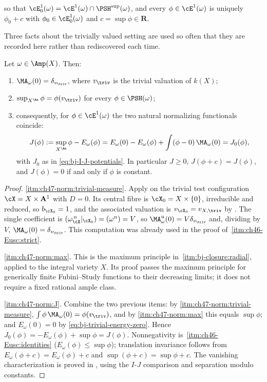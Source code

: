 so that $\cE^1_0(\omega)=\cE^1(\omega)\cap\PSH^{\sup}(\omega)$, and every
$\phi\in\cE^1(\omega)$ is uniquely $\phi_0+c$ with
$\phi_0\in\cE^1_0(\omega)$ and $c=\sup\phi\in\mathbf R$.

Three facts about the trivially valued setting are used so often that they
are recorded here rather than rediscovered each time.

\begin{lemma}
\label{lem:ch47-three-normalizations}
Let $\omega\in\Amp(X)$.  Then:
\begin{enumerate}
\item\label{itm:ch47-norm:trivial-measure}
      $\MA_\omega(0)=\delta_{v_{\triv}}$, where $v_{\triv}$ is the
      trivial valuation of $k(X)$;
\item\label{itm:ch47-norm:max}
      $\sup_{X^{\An}}\phi=\phi(v_{\triv})$ for every
      $\phi\in\PSH(\omega)$;
\item\label{itm:ch47-norm:J}
      consequently, for $\phi\in\cE^1(\omega)$ the two natural
      normalizing functionals coincide:
      \[
       J(\phi):=\sup_{X^{\An}}\phi-E_\omega(\phi)
       =E_\omega(0)-E_\omega(\phi)+\int(\phi-0)\,\MA_\omega(0)
       =J_0(\phi),
      \]
      with $J_0$ as in \eqref{eq:bj-I-J-potentials}.  In particular
      $J\ge0$, $J(\phi+c)=J(\phi)$, and $J(\phi)=0$ if and only if
      $\phi$ is constant.
\end{enumerate}
\end{lemma}

\begin{proof}
\cref{itm:ch47-norm:trivial-measure}.  Apply
 on the trivial test configuration
$\cX=X\times\mathbf A^1$ with $D=0$.  Its central fibre is
$\cX_0=X\times\{0\}$, irreducible and reduced, so $b_{\cX_0}=1$, and
the associated valuation is $v_{\cX_0}=v_{X,\triv}$ by
.  The single coefficient is
$(\omega_{\cX}^{\,n}|_{\cX_0})=(\omega^n)=V$, so
$\MA^{\mathrm u}_\omega(0)=V\delta_{v_{\triv}}$ and, dividing by $V$,
$\MA_\omega(0)=\delta_{v_{\triv}}$.  This computation was already used in
the proof of \,\cref{itm:ch46-Eusc:strict}.

\cref{itm:ch47-norm:max}. This is the maximum principle in
\,\cref{itm:bj-closure:radial}, applied to
the integral variety $X$. Its proof passes the maximum principle for
generically finite Fubini--Study functions to their decreasing limits;
it does not require a fixed rational ample class.

\cref{itm:ch47-norm:J}.  Combine the two previous items: by
\cref{itm:ch47-norm:trivial-measure},
$\int\phi\,\MA_\omega(0)=\phi(v_{\triv})$, and by
\cref{itm:ch47-norm:max} this equals $\sup\phi$; and
$E_\omega(0)=0$ by \eqref{eq:bj-trivial-energy-zero}.  Hence
$J_0(\phi)=-E_\omega(\phi)+\sup\phi=J(\phi)$.
Nonnegativity is \,\cref{itm:ch46-Eusc:identities}
($E_\omega(\phi)\le\sup\phi$); translation invariance follows from
$E_\omega(\phi+c)=E_\omega(\phi)+c$ and
$\sup(\phi+c)=\sup\phi+c$.  The vanishing characterization is proved in
, using the $I$-$J$ comparison and separation
modulo constants.
\end{proof}

